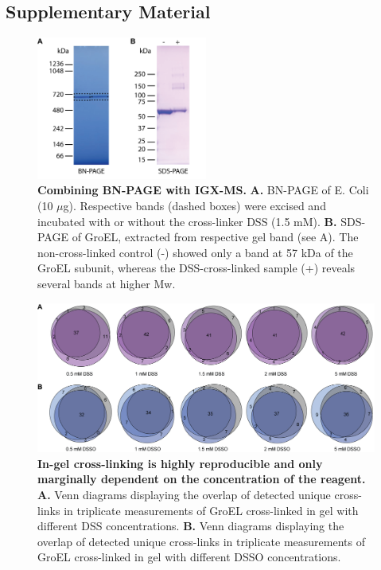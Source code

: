 \clearpage
\begin{subappendices}
    \section{Supplementary Material}

    \begin{figure}[hbt!]
        \center
        \includegraphics[width=0.5\textwidth]{Chapter.2/Figures/SI_Fig1.png} 
        \caption{\textbf{Combining BN-PAGE with IGX-MS.} \textbf{A.} BN-PAGE of E. Coli (10 $\mu$g). Respective bands (dashed boxes) were excised and incubated with or without the cross-linker DSS (1.5 mM). \textbf{B.} SDS-PAGE of GroEL, extracted from respective gel band (see A). The non-cross-linked control (-) showed only a band at 57 kDa of the GroEL subunit, whereas the DSS-cross-linked sample (+) reveals several bands at higher Mw.}
        \label{fig:ch2_app_fig1}
    \end{figure}

    \vspace{1cm}

    \begin{figure}[hbt!]
        \center
        \includegraphics[width=\textwidth]{Chapter.2/Figures/SI_Fig2.png} 
        \caption{\textbf{In-gel cross-linking is highly reproducible and only marginally dependent on the concentration of the reagent.} \textbf{A.} Venn diagrams displaying the overlap of detected unique cross-links in triplicate measurements of GroEL cross-linked in gel with different DSS concentrations. \textbf{B.} Venn diagrams displaying the overlap of detected unique cross-links in triplicate measurements of GroEL cross-linked in gel with different DSSO concentrations.}
        \label{fig:ch2_app_fig2}
    \end{figure}


\end{subappendices}
